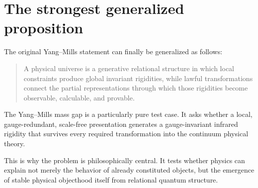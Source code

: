 \documentclass[11pt]{article}
\begin{document}
\section{The strongest generalized proposition}

The original Yang--Mills statement can finally be generalized as follows:
\begin{quote}
A physical universe is a generative relational structure in which local
constraints produce global invariant rigidities, while lawful transformations
connect the partial representations through which those rigidities become
observable, calculable, and provable.
\end{quote}

The Yang--Mills mass gap is a particularly pure test case.  It asks whether a
local, gauge-redundant, scale-free presentation generates a gauge-invariant
infrared rigidity that survives every required transformation into the
continuum physical theory.

This is why the problem is philosophically central.  It tests whether physics
can explain not merely the behavior of already constituted objects, but the
emergence of stable physical objecthood itself from relational quantum
structure.
\end{document}
